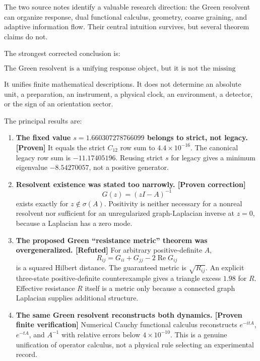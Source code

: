 \documentclass[11pt,a4paper,openany]{report}
\newcommand{\statusProven}{\textcolor{fingreen}{[Proven]}}
\newcommand{\statusRefuted}{\textcolor{finred}{[Refuted]}}
\begin{document}
The two source notes identify a valuable research direction: the Green resolvent can organize response, dual functional calculus, geometry, coarse graining, and adaptive information flow. Their central intuition survives, but several theorem claims do not.

The strongest corrected conclusion is:

\[
\boxed{
\text{The Green resolvent is a unifying response object, but it is not the missing physical principle.}
}
\]

It unifies finite mathematical descriptions. It does not determine an absolute unit, a preparation, an instrument, a physical clock, an environment, a detector, or the sign of an orientation sector.

The principal results are:

\begin{enumerate}
\item 
\textbf{The fixed value \(s=1.660307278766099\) belongs to strict, not legacy. \statusProven{}} It equals the strict \(C_{12}\) row sum to \(4.4\times10^{-16}\). The canonical legacy row sum is \(-11.17405196\). Reusing strict \(s\) for legacy gives a minimum eigenvalue \(-8.54270057\), not a positive generator.

\item 
\textbf{Resolvent existence was stated too narrowly. [Proven correction]} \[
   G(z)=(zI-A)^{-1}
   \] exists exactly for \(z\notin\sigma(A)\). Positivity is neither necessary for a nonreal resolvent nor sufficient for an unregularized graph-Laplacian inverse at \(z=0\), because a Laplacian has a zero mode.

\item 
\textbf{The proposed Green “resistance metric” theorem was overgeneralized. \statusRefuted{}} For arbitrary positive-definite \(A\), \[
   R_{ij}=G_{ii}+G_{jj}-2\operatorname{Re}G_{ij}
   \] is a squared Hilbert distance. The guaranteed metric is \(\sqrt{R_{ij}}\). An explicit three-state positive-definite counterexample gives a triangle excess \(1.98\) for \(R\). Effective resistance \(R\) itself is a metric only because a connected graph Laplacian supplies additional structure.

\item 
\textbf{The same Green resolvent reconstructs both dynamics. [Proven finite verification]} Numerical Cauchy functional calculus reconstructs \(e^{-itA}\), \(e^{-tA}\), and \(A^{-1}\) with relative errors below \(4\times10^{-10}\). This is a genuine unification of operator calculus, not a physical rule selecting an experimental record.


\end{enumerate}
\end{document}
